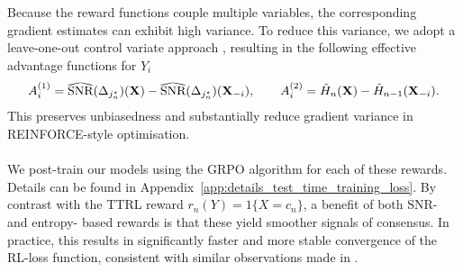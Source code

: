 \\\\
Because the reward functions couple multiple variables, the corresponding gradient estimates can exhibit high variance. To reduce this variance, we adopt a leave-one-out control variate approach \citep{tang2025optimizing}, resulting in the following effective advantage functions for $Y_i$
\small
\begin{equation}\label{eq:effective_advantage_main_text}
A_i^{(1)} = \reallywidehat{\text{SNR}}(\Delta_{j_n^\star})(\mathbf X) - \reallywidehat{\text{SNR}}(\Delta_{j_n^\star})(\mathbf X_{-i}), \qquad A_i^{(2)} = \hat{H}_n(\mathbf X) - \hat{H}_{n-1}(\mathbf X_{-i}).
\end{equation}
\normalsize
This preserves unbiasedness and substantially reduce gradient variance in REINFORCE-style
optimisation.  
\\\\
We post-train our models using the {GRPO} algorithm \citep{shao2024deepseekmathpushinglimitsmathematical} for each of these rewards.  Details can be found in Appendix~\ref{app:details_test_time_training_loss}.   By contrast with the TTRL reward $r_n(Y)=1\{X=\hat{c}_n\}$, a benefit of both SNR- and entropy- based rewards is that these yield smoother signals of consensus.  In practice, this results in significantly faster and more stable convergence of the RL-loss function, consistent with similar observations made in \cite{huang2025pitfalls,ma2025general,tao2025hybrid}.

